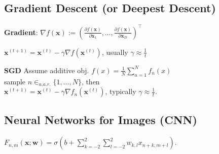 \subsection*{Gradient Descent (or Deepest Descent)}
\textbf{Gradient}: $\nabla f(\mathbf{x}) := \left( \frac{\partial f(\mathbf{x})}{\partial \mathbf{x}_1}, \ldots, \frac{\partial f(\mathbf{x})}{\partial \mathbf{x}_D} \right)^\top$

$\mathbf{x}^{(t+1)} = \mathbf{x}^{(t)} - \gamma \nabla f(\mathbf{x}^{(t)})$, usually $\gamma \approx \frac{1}{t}$

\textbf{SGD} Assume additive obj. $f(x) = \frac{1}{N}\sum_{n=1}^{N}f_n(x)$\\
sample $n \in_{u.a.r.} \{1, \ldots, N\}$, then\\
$\mathbf{x}^{(t+1)} = \mathbf{x}^{(t)} - \gamma \nabla f_n(\mathbf{x}^{(t)})$, typically  $\gamma \approx \frac{1}{t}$.

\subsection*{Neural Networks for Images (CNN)}
$F_{n,m}(\mathbf{x};\mathbf{w}) = \sigma(b + \sum_{k=-2}^2\sum_{l=-2}^{2}{w_{k,l}x_{n+k,m+l}})$. 
